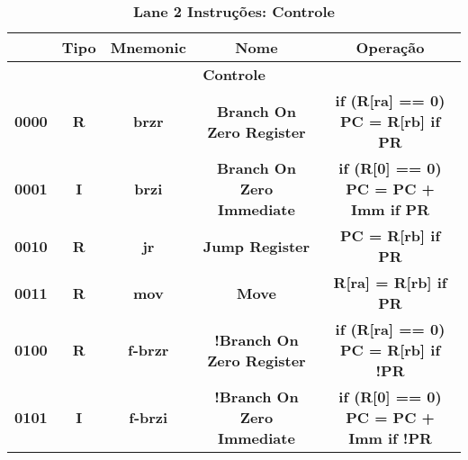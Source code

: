 \documentclass{article}
\begin{document}
    \begin{table}[H]
      \centering
      \captionsetup{labelformat=empty, skip=0pt}
      \caption{\textbf{Lane 2 Instruções: Controle}}
      \noindent\hspace*{-2.5cm}
      \begin{tabular}{|c|*{4}{c|}}
        \hline
        \rowcolor{gray!50}
        \multicolumn{1}{|c|}{\textbf{Opcode}} & \multicolumn{1}{|c|}{\textbf{Tipo}} & \multicolumn{1}{|c|}{\textbf{Mnemonic}} & \multicolumn{1}{|c|}{\textbf{Nome}}                     & \multicolumn{1}{|c|}{\textbf{Operação}}                                        \\ \hline
        \multicolumn{5}{|c|}{\textbf{Controle}} \\ \hline 
        \multicolumn{1}{|c|}{\textbf{0000}}   & \multicolumn{1}{c|}{\textbf{R}}     & \multicolumn{1}{c|}{\textbf{brzr}}      & \multicolumn{1}{c|}{\textbf{Branch On Zero Register}}   & \multicolumn{1}{c|}{\textbf{if (R[ra] == 0) PC = R[rb] if PR}}                 \\ \hline
        \multicolumn{1}{|c|}{\textbf{0001}}   & \multicolumn{1}{c|}{\textbf{I}}     & \multicolumn{1}{c|}{\textbf{brzi}}      & \multicolumn{1}{c|}{\textbf{Branch On Zero Immediate}}  & \multicolumn{1}{c|}{\textbf{if (R[0] == 0) PC = PC + Imm if PR}}               \\ \hline
        \multicolumn{1}{|c|}{\textbf{0010}}   & \multicolumn{1}{c|}{\textbf{R}}     & \multicolumn{1}{c|}{\textbf{jr}}        & \multicolumn{1}{c|}{\textbf{Jump Register}}             & \multicolumn{1}{c|}{\textbf{PC = R[rb] if PR}}                                 \\ \hline
        \multicolumn{1}{|c|}{\textbf{0011}}   & \multicolumn{1}{c|}{\textbf{R}}     & \multicolumn{1}{c|}{\textbf{mov}}       & \multicolumn{1}{c|}{\textbf{Move}}                      & \multicolumn{1}{c|}{\textbf{R[ra] = R[rb] if PR}}                              \\ \hline
        \multicolumn{1}{|c|}{\textbf{0100}}   & \multicolumn{1}{c|}{\textbf{R}}     & \multicolumn{1}{c|}{\textbf{f-brzr}}    & \multicolumn{1}{c|}{\textbf{!Branch On Zero Register}}  & \multicolumn{1}{c|}{\textbf{if (R[ra] == 0) PC = R[rb] if !PR}}                \\ \hline
        \multicolumn{1}{|c|}{\textbf{0101}}   & \multicolumn{1}{c|}{\textbf{I}}     & \multicolumn{1}{c|}{\textbf{f-brzi}}    & \multicolumn{1}{c|}{\textbf{!Branch On Zero Immediate}} & \multicolumn{1}{c|}{\textbf{if (R[0] == 0) PC = PC + Imm if !PR}}              \\ \hline

\end{tabular}
\end{table}
\end{document}
